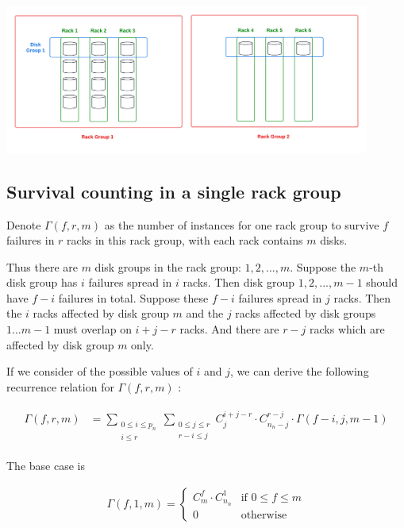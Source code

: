 \documentclass{article}
\begin{document}
\begin{center}
    \includegraphics[width=0.9\textwidth]{netraid_layout.png}
\end{center}

\subsection{Survival counting in a single rack group}

Denote $\Gamma(f,r,m)$ as the number of instances for one rack group to survive $f$ failures in $r$ racks in this rack group, with each rack contains $m$ disks.

Thus there are $m$ disk groups in the rack group: $1,2,..., m$. Suppose the $m$-th disk group has $i$ failures spread in $i$ racks. Then disk group $1,2,...,m-1$ should have $f-i$ failures in total. Suppose these $f-i$ failures spread in $j$ racks. Then the $i$ racks affected by disk group $m$ and the $j$ racks affected by disk groups $1...m-1$ must overlap on $i+j-r$ racks. And there are $r-j$ racks which are affected by disk group $m$ only.

If we consider of the possible values of $i$ and $j$, we can derive the following recurrence relation for $\Gamma(f,r,m)$ :

\begin{eqnarray}
\begin{aligned}
  \Gamma(f,r,m) &= \sum_{\substack{0 \leq i \leq p_n \\ i\leq r}} 
                \sum_{\substack{0 \leq j \leq r \\ r-i \leq j}}
                C_{j}^{i+j-r} \cdot C_{n_n-j}^{r-j} \cdot \Gamma(f-i, j, m-1) 
\end{aligned}
\label{eq:netraid:1}
\end{eqnarray}

The base case is 

\begin{eqnarray}
  \Gamma(f,1,m) =
    \begin{cases}
      C_{m}^f \cdot C_{n_n}^1 & \text{if $0 \leq f \leq m$}\\
      0 & \text{otherwise}
    \end{cases}       
\label{eq:netraid:2}
\end{eqnarray}
\end{document}
